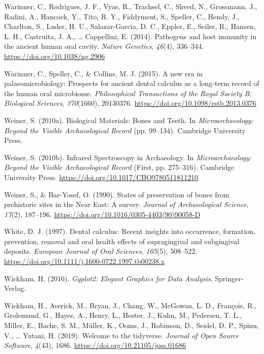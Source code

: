 \documentclass[
  b5paper,
]{book}
\newlength{\cslhangindent}
\newenvironment{CSLReferences}[2] %
 {\begin{list}{}{%
  \setlength{\itemindent}{0pt}
  \setlength{\leftmargin}{0pt}
  \setlength{\parsep}{0pt}
  \ifodd #1
   \setlength{\leftmargin}{\cslhangindent}
   \setlength{\itemindent}{-1\cslhangindent}
  \fi
  \setlength{\itemsep}{#2\baselineskip}}}
 {\end{list}}
\begin{document}
\begin{CSLReferences}{1}{0}
Warinner, C., Rodrigues, J. F., Vyas, R., Trachsel, C., Shved, N.,
Grossmann, J., Radini, A., Hancock, Y., Tito, R. Y., Fiddyment, S.,
Speller, C., Hendy, J., Charlton, S., Luder, H. U., Salazar-Garcia, D.
C., Eppler, E., Seiler, R., Hansen, L. H., Castruita, J. A., \ldots{}
Cappellini, E. (2014). Pathogens and host immunity in the ancient human
oral cavity. \emph{Nature Genetics}, \emph{46}(4), 336--344.
\url{https://doi.org/10.1038/ng.2906}

Warinner, C., Speller, C., \& Collins, M. J. (2015). A new era in
palaeomicrobiology: Prospects for ancient dental calculus as a long-term
record of the human oral microbiome. \emph{Philosophical Transactions of
the Royal Society B: Biological Sciences}, \emph{370}(1660), 20130376.
\url{https://doi.org/10.1098/rstb.2013.0376}

Weiner, S. (2010a). Biological {Materials}: {Bones} and {Teeth}. In
\emph{Microarchaeology: {Beyond} the {Visible Archaeological Record}}
(pp. 99--134). {Cambridge University Press}.

Weiner, S. (2010b). Infrared {Spectroscopy} in {Archaeology}. In
\emph{Microarchaeology: {Beyond} the {Visible Archaeological Record}}
(First, pp. 275--316). {Cambridge University Press}.
\url{https://doi.org/10.1017/CBO9780511811210}

Weiner, S., \& Bar-Yosef, O. (1990). States of preservation of bones
from prehistoric sites in the {Near East}: {A} survey. \emph{Journal of
Archaeological Science}, \emph{17}(2), 187--196.
\url{https://doi.org/10.1016/0305-4403(90)90058-D}

White, D. J. (1997). Dental calculus: Recent insights into occurrence,
formation, prevention, removal and oral health effects of supragingival
and subgingival deposits. \emph{European Journal of Oral Sciences},
\emph{105}(5), 508--522.
\url{https://doi.org/10.1111/j.1600-0722.1997.tb00238.x}

Wickham, H. (2016). \emph{Ggplot2: {Elegant Graphics} for {Data
Analysis}}. {Springer-Verlag}.

Wickham, H., Averick, M., Bryan, J., Chang, W., McGowan, L. D.,
François, R., Grolemund, G., Hayes, A., Henry, L., Hester, J., Kuhn, M.,
Pedersen, T. L., Miller, E., Bache, S. M., Müller, K., Ooms, J.,
Robinson, D., Seidel, D. P., Spinu, V., \ldots{} Yutani, H. (2019).
Welcome to the {tidyverse}. \emph{Journal of Open Source Software},
\emph{4}(43), 1686. \url{https://doi.org/10.21105/joss.01686}


\end{CSLReferences}
\end{document}
